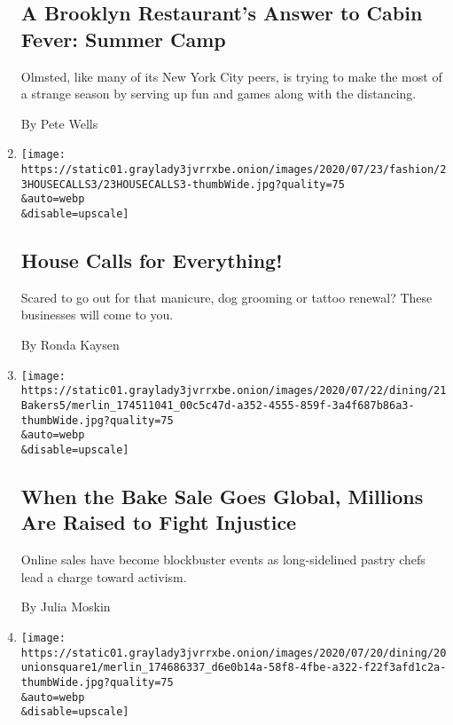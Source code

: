 \begin{enumerate}
{  \subsection{A Brooklyn Restaurant's Answer to Cabin Fever: Summer
  Camp}\label{a-brooklyn-restaurants-answer-to-cabin-fever-summer-camp}}

  Olmsted, like many of its New York City peers, is trying to make the
  most of a strange season by serving up fun and games along with the
  distancing.

  By Pete Wells
\item
  \href{/2020/07/23/style/coronavirus-manicures-haircuts-tattoos-dog-groomer-at-home.html}{}

  \texttt{[image: https://static01.graylady3jvrrxbe.onion/images/2020/07/23/fashion/23HOUSECALLS3/23HOUSECALLS3-thumbWide.jpg?quality=75\\\&auto=webp\\\&disable=upscale]}

  \hypertarget{house-calls-for-everything}{%
  \subsection{House Calls for
  Everything!}\label{house-calls-for-everything}}

  Scared to go out for that manicure, dog grooming or tattoo renewal?
  These businesses will come to you.

  By Ronda Kaysen
\item
  \href{/2020/07/21/dining/bake-sale-activism-racism.html}{}

  \texttt{[image: https://static01.graylady3jvrrxbe.onion/images/2020/07/22/dining/21Bakers5/merlin\_174511041\_00c5c47d-a352-4555-859f-3a4f687b86a3-thumbWide.jpg?quality=75\\\&auto=webp\\\&disable=upscale]}

  \hypertarget{when-the-bake-sale-goes-global-millions-are-raised-to-fight-injustice}{%
  \subsection{When the Bake Sale Goes Global, Millions Are Raised to
  Fight
  Injustice}\label{when-the-bake-sale-goes-global-millions-are-raised-to-fight-injustice}}

  Online sales have become blockbuster events as long-sidelined pastry
  chefs lead a charge toward activism.

  By Julia Moskin
\item
  \href{/2020/07/20/dining/danny-meyer-no-tips.html}{}

  \texttt{[image: https://static01.graylady3jvrrxbe.onion/images/2020/07/20/dining/20unionsquare1/merlin\_174686337\_d6e0b14a-58f8-4fbe-a322-f22f3afd1c2a-thumbWide.jpg?quality=75\\\&auto=webp\\\&disable=upscale]}


\end{enumerate}
